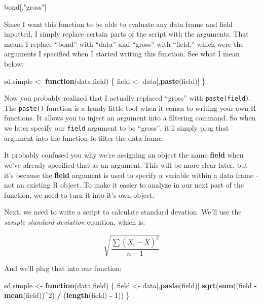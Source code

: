 \documentclass[
]{book}
\newenvironment{Shaded}{\begin{snugshade}}{\end{snugshade}}
\newcommand{\ControlFlowTok}[1]{\textcolor[rgb]{0.13,0.29,0.53}{\textbf{#1}}}
\newcommand{\DecValTok}[1]{\textcolor[rgb]{0.00,0.00,0.81}{#1}}
\newcommand{\KeywordTok}[1]{\textcolor[rgb]{0.13,0.29,0.53}{\textbf{#1}}}
\newcommand{\NormalTok}[1]{#1}
\newcommand{\OperatorTok}[1]{\textcolor[rgb]{0.81,0.36,0.00}{\textbf{#1}}}
\newcommand{\StringTok}[1]{\textcolor[rgb]{0.31,0.60,0.02}{#1}}
\begin{document}
\begin{center}
\begin{Shaded}
\begin{Highlighting}[]
\NormalTok{bond[,}\StringTok{"gross"}\NormalTok{]}
\end{Highlighting}
\end{Shaded}

Since I want this function to be able to evaluate any data frame and field inputted, I simply replace certain parts of the script with the arguments. That means I replace ``bond'' with ``data'' and ``gross'' with ``field,'' which were the arguments I specified when I started writing this function. See what I mean below:

\begin{Shaded}
\begin{Highlighting}[]
\NormalTok{sd.simple <-}\StringTok{ }\ControlFlowTok{function}\NormalTok{(data,field) \{}
\NormalTok{  field <-}\StringTok{ }\NormalTok{data[,}\KeywordTok{paste}\NormalTok{(field)]}
\NormalTok{\}}
\end{Highlighting}
\end{Shaded}

Now you probably realized that I actually replaced ``gross'' with \texttt{paste(field)}. The \texttt{paste()} function is a handy little tool when it comes to writing your own R functions. It allows you to inject an argument into a filtering command. So when we later specify our \texttt{field} argument to be ``gross'', it'll simply plug that argument into the function to filter the data frame.

It probably confused you why we're assigning an object the name \textbf{field} when we've already specified that as an argument. This will be more clear later, but it's because the \textbf{field} argument is used to specify a variable within a data frame - not an existing R object. To make it easier to analyze in our next part of the function, we need to turn it into it's own object.

Next, we need to write a script to calculate standard devation. We'll use the \emph{sample standard deviation} equation, which is:

\[
 \sqrt{\frac{\sum{(X_i-\bar{X})^2}}{n-1}}
\]

And we'll plug that into our function:

\begin{Shaded}
\begin{Highlighting}[]
\NormalTok{sd.simple <-}\StringTok{ }\ControlFlowTok{function}\NormalTok{(data,field) \{}
\NormalTok{  field <-}\StringTok{ }\NormalTok{data[,}\KeywordTok{paste}\NormalTok{(field)]}
  \KeywordTok{sqrt}\NormalTok{(}\KeywordTok{sum}\NormalTok{((field }\OperatorTok{-}\StringTok{ }\KeywordTok{mean}\NormalTok{(field))}\OperatorTok{^}\DecValTok{2}\NormalTok{)}
       \OperatorTok{/}\StringTok{ }\NormalTok{(}\KeywordTok{length}\NormalTok{(field) }\OperatorTok{-}\StringTok{ }\DecValTok{1}\NormalTok{))}
\NormalTok{\}}
\end{Highlighting}
\end{Shaded}


\end{center}
\end{document}
